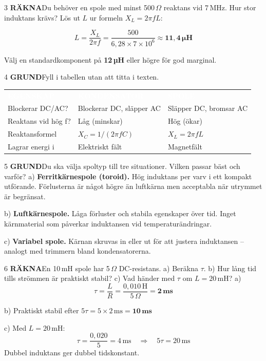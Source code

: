 \documentclass[a4paper,11pt,twoside]{book}
\newcommand{\tblhdr}[1]{\cellcolor{greydark}\textcolor{white}{\headingfont\bfseries\footnotesize\MakeUppercase{#1}}}
\newcommand{\qgrund}{\colorbox{greenpale}{\textcolor{greendark}{\headingfont\bfseries\tiny GRUND}}}
\newcommand{\qrakna}{\colorbox{bluepale}{\textcolor{bluedark}{\headingfont\bfseries\tiny RÄKNA}}}
\begin{document}
\begin{facitblock}{3}
\qrakna\quad Du behöver en spole med minst 500\,$\Omega$ 
reaktans vid 7\,MHz. Hur stor induktans krävs?
\tcblower
Lös ut $L$ ur formeln $X_L = 2\pi f L$:

\[ L = \frac{X_L}{2\pi f} = \frac{500}{6{,}28 \times 7 \times 10^6} \approx \mathbf{11{,}4\,\mu\text{H}} \]

Välj en standardkomponent på \textbf{12\,µH} eller högre 
för god marginal.
\end{facitblock}

\begin{facitblock}{4}
\qgrund\quad Fyll i tabellen utan att titta i texten.
\tcblower
\begin{center}
\begin{tabular}{L{3.5cm}L{3cm}L{3cm}}
\tblhdr{Egenskap} & \tblhdr{Kondensator} & \tblhdr{Spole} \\
Blockerar DC/AC? & Blockerar DC, släpper AC & Släpper DC, bromsar AC \\
Reaktans vid hög f? & Låg (minskar) & Hög (ökar) \\
Reaktansformel & $X_C = 1/(2\pi fC)$ & $X_L = 2\pi fL$ \\
Lagrar energi i & Elektriskt fält & Magnetfält \\
\end{tabular}
\end{center}
\end{facitblock}

\begin{facitblock}{5}
\qgrund\quad Du ska välja spoltyp till tre situationer. 
Vilken passar bäst och varför?
\tcblower
a) \textbf{Ferritkärnespole (toroid).} Hög induktans per 
varv i ett kompakt utförande. Förlusterna är något högre 
än luftkärna men acceptabla när utrymmet är begränsat.

b) \textbf{Luftkärnespole.} Låga förluster och stabila 
egenskaper över tid. Inget kärnmaterial som påverkar 
induktansen vid temperaturändringar.

c) \textbf{Variabel spole.} Kärnan skruvas in eller ut 
för att justera induktansen -- analogt med trimmern bland 
kondensatorerna.
\end{facitblock}

\begin{facitblock}{6}
\qrakna\quad En 10\,mH spole har 5\,$\Omega$ DC-resistans. 
a) Beräkna $\tau$. b) Hur lång tid tills strömmen är 
praktiskt stabil? c) Vad händer med $\tau$ om $L = 20$\,mH?
\tcblower
a)
\[ \tau = \frac{L}{R} = \frac{0{,}010\,\text{H}}{5\,\Omega} = \mathbf{2\,\text{ms}} \]

b) Praktiskt stabil efter $5\tau = 5 \times 2\,\text{ms} = \mathbf{10\,\text{ms}}$

c) Med $L = 20$\,mH:
\[ \tau = \frac{0{,}020}{5} = 4\,\text{ms} \quad \Rightarrow \quad 5\tau = 20\,\text{ms} \]
Dubbel induktans ger dubbel tidskonstant.
\end{facitblock}
\end{document}
